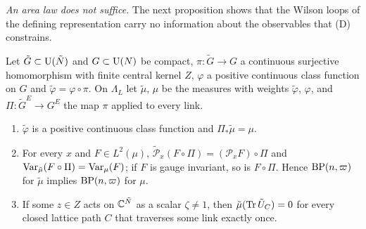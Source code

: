 \emph{An area law does not suffice.} The next proposition shows that the
Wilson loops of the defining representation carry no information about the
observables that (D) constrains.

\begin{proposition}\label{prop:cover}
Let $\tilde G\subset\mathrm{U}(\tilde N)$ and $G\subset\mathrm{U}(N)$ be compact,
$\pi:\tilde G\to G$ a continuous surjective homomorphism with finite central
kernel $Z$, $\varphi$ a positive continuous class function on $G$ and
$\tilde\varphi=\varphi\circ\pi$. On $\Lambda_L$ let $\tilde\mu$, $\mu$ be the
measures with weights $\tilde\varphi$, $\varphi$, and $\Pi:\tilde G^E\to G^E$
the map $\pi$ applied to every link.
\begin{enumerate}[label=\textup{(\roman*)},leftmargin=*]
\item $\tilde\varphi$ is a positive continuous class function and
$\Pi_*\tilde\mu=\mu$.
\item For every $x$ and $F\in L^2(\mu)$, $\tilde{\mathcal P}_x(F\circ\Pi)=
(\mathcal P_xF)\circ\Pi$ and $\operatorname{Var}_{\tilde\mu}(F\circ\Pi)=\operatorname{Var}_\mu(F)$; if $F$
is gauge invariant, so is $F\circ\Pi$. Hence $\mathrm{BP}(n,\varpi)$ for $\tilde\mu$
implies $\mathrm{BP}(n,\varpi)$ for $\mu$.
\item If some $z\in Z$ acts on $\mathbb{C}^{\tilde N}$ as a scalar $\zeta\ne1$, then
$\tilde\mu(\operatorname{Tr}\tilde U_C)=0$ for every closed lattice path $C$ that traverses
some link exactly once.
\end{enumerate}
\end{proposition}

